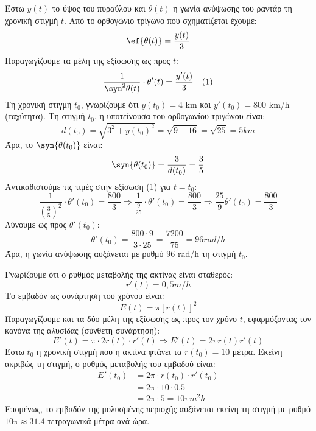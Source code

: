 Έστω $y(t)$ το ύψος του πυραύλου και $\theta(t)$ η γωνία ανύψωσης του ραντάρ τη χρονική στιγμή $t$. 
Από το ορθογώνιο τρίγωνο που σχηματίζεται έχουμε:
\[ \ef{\theta(t)} = \frac{y(t)}{3} \]
Παραγωγίζουμε τα μέλη της εξίσωσης ως προς $t$:
\[ \frac{1}{\syn^2{\theta(t)}} \cdot \theta'(t) = \frac{y'(t)}{3} \quad (1) \]
Τη χρονική στιγμή $t_0$, γνωρίζουμε ότι $y(t_0) = 4$ \si{km} και $y'(t_0) = 800$ \si{km/h} (ταχύτητα).
Τη στιγμή $t_0$, η υποτείνουσα του ορθογωνίου τριγώνου είναι:
\[ d(t_0) = \sqrt{3^2 + y(t_0)^2} = \sqrt{9 + 16} = \sqrt{25} = 5 \si{ km} \]
Άρα, το $\syn{\theta(t_0)}$ είναι:
\[ \syn{\theta(t_0)} = \frac{3}{d(t_0)} = \frac{3}{5} \]
Αντικαθιστούμε τις τιμές στην εξίσωση (1) για $t = t_0$:
\[ \frac{1}{\left(\frac{3}{5}\right)^2} \cdot \theta'(t_0) = \frac{800}{3} \Rightarrow \frac{1}{\frac{9}{25}} \cdot \theta'(t_0) = \frac{800}{3} \Rightarrow \frac{25}{9} \theta'(t_0) = \frac{800}{3} \]
Λύνουμε ως προς $\theta'(t_0)$:
\[ \theta'(t_0) = \frac{800 \cdot 9}{3 \cdot 25} = \frac{7200}{75} = 96 \si{ rad/h} \]
Άρα, η γωνία ανύψωσης αυξάνεται με ρυθμό $96$ \si{rad/h} τη στιγμή $t_0$.\\


\lysh
Γνωρίζουμε ότι ο ρυθμός μεταβολής της ακτίνας είναι σταθερός:
\[ r'(t) = 0{,}5 \si{ m/h} \]
Το εμβαδόν ως συνάρτηση του χρόνου είναι:
\[ E(t) = \pi [r(t)]^2 \]
Παραγωγίζουμε και τα δύο μέλη της εξίσωσης ως προς τον χρόνο $t$, εφαρμόζοντας τον κανόνα της αλυσίδας (σύνθετη συνάρτηση):
\[ E'(t) = \pi \cdot 2r(t) \cdot r'(t) \Rightarrow E'(t) = 2\pi r(t) r'(t) \]
Έστω $t_0$ η χρονική στιγμή που η ακτίνα φτάνει τα $r(t_0) = 10$ μέτρα. Εκείνη ακριβώς τη στιγμή, ο ρυθμός μεταβολής του εμβαδού είναι:
\begin{align*}
E'(t_0) &= 2\pi \cdot r(t_0) \cdot r'(t_0) \\
&= 2\pi \cdot 10 \cdot 0.5 \\
&= 2\pi \cdot 5 = 10\pi \si{ m^2h}
\end{align*}
Επομένως, το εμβαδόν της μολυσμένης περιοχής αυξάνεται εκείνη τη στιγμή με ρυθμό $10\pi \approx 31.4$ τετραγωνικά μέτρα ανά ώρα.


